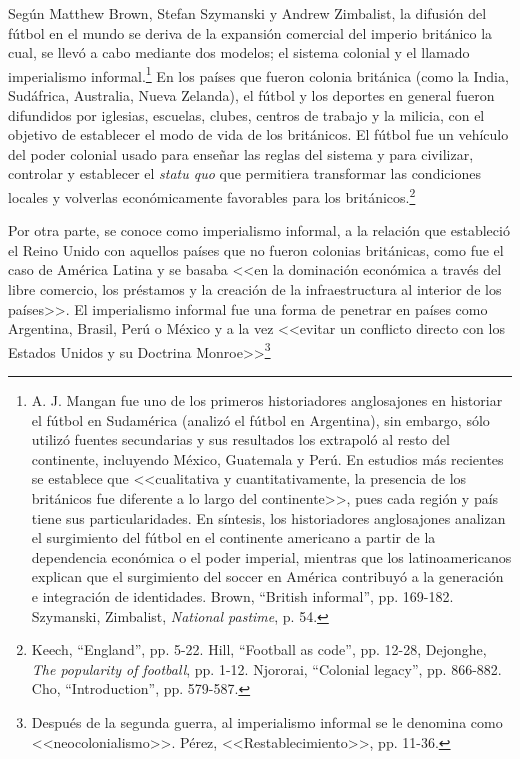 \documentclass[11pt,a5paper,twoside]{book} %
\begin{document}
Según Matthew Brown, Stefan Szymanski y Andrew Zimbalist, la difusión del fútbol
en el mundo se deriva de la expansión comercial del imperio británico la cual, se llevó a cabo
mediante dos modelos; el sistema colonial y el llamado imperialismo informal.\footnote{A. J. Mangan fue uno de los primeros historiadores anglosajones en historiar el fútbol en Sudamérica (analizó el fútbol en Argentina), sin embargo, sólo utilizó fuentes secundarias y sus resultados los extrapoló al resto del continente, incluyendo México, Guatemala y Perú. En estudios más recientes se establece que <<cualitativa y cuantitativamente, la presencia de los británicos fue diferente a lo largo del continente>>, pues cada región y país tiene sus particularidades. En síntesis, los historiadores anglosajones analizan el surgimiento del fútbol en el continente americano a partir de la dependencia económica o el poder imperial, mientras que los latinoamericanos explican que el surgimiento del soccer en América contribuyó a la generación e integración de identidades. Brown, ``British informal'', pp. 169-182. Szymanski, Zimbalist, \emph{National pastime}, p. 54.} En los
países que fueron colonia británica (como la India, Sudáfrica, Australia, Nueva Zelanda), el
fútbol y los deportes en general fueron difundidos por iglesias, escuelas, clubes, centros de
trabajo y la milicia, con el objetivo de establecer el modo de vida de los británicos. El fútbol
fue un vehículo del poder colonial usado para enseñar las reglas del sistema y para civilizar, controlar y establecer el \emph{statu quo} que permitiera transformar las condiciones locales y
volverlas económicamente favorables para los británicos.\footnote{Keech, ``England'', pp. 5-22. Hill, ``Football as code'', pp. 12-28, Dejonghe, \emph{The popularity of football}, pp. 1-12. Njororai, ``Colonial legacy'', pp. 866-882. Cho, ``Introduction'', pp. 579-587.}

Por otra parte, se conoce como imperialismo informal, a la relación que estableció el
Reino Unido con aquellos países que no fueron colonias británicas, como fue el caso de América Latina y se basaba <<en la dominación económica a través del libre comercio, los préstamos y la creación de la infraestructura al interior de los países>>. El imperialismo informal fue una forma de penetrar en países como Argentina, Brasil, Perú o México y a la vez <<evitar un conflicto directo con los Estados Unidos y su Doctrina Monroe>>\footnote{Después de la segunda guerra, al imperialismo informal se le denomina como <<neocolonialismo>>. Pérez, <<Restablecimiento>>, pp. 11-36.}
\end{document}
